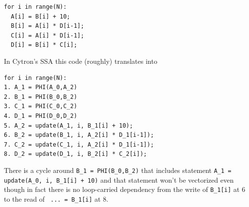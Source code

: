 \documentclass[sigconf, screen, natbib=false, dvipsnames, table]{acmart}
\theoremstyle{definition}
\begin{document}
{\small
\begin{verbatim}
for i in range(N):
  A[i] = B[i] + 10;
  B[i] = A[i] * D[i-1];
  C[i] = A[i] * D[i-1];
  D[i] = B[i] * C[i];
\end{verbatim}
}

In Cytron's SSA this code (roughly) translates into

{\small
\begin{verbatim}
for i in range(N):
1. A_1 = PHI(A_0,A_2)
2. B_1 = PHI(B_0,B_2)
3. C_1 = PHI(C_0,C_2)
4. D_1 = PHI(D_0,D_2)
5. A_2 = update(A_1, i, B_1[i] + 10); 
6. B_2 = update(B_1, i, A_2[i] * D_1[i-1]);
7. C_2 = update(C_1, i, A_2[i] * D_1[i-1]);
8. D_2 = update(D_1, i, B_2[i] * C_2[i]);
\end{verbatim}
}

There is a cycle around \texttt{B\_1 = PHI(B\_0,B\_2)} that includes statement 
\texttt{A\_1 = update(A\_0, i, B\_1[i] + 10)} and that statement won't be vectorized even 
though in fact there is no loop-carried dependency from the write of \texttt{B\_1[i]} at 6 to the
read of \texttt{ ... = B\_1[i]} at 8.
\end{document}
